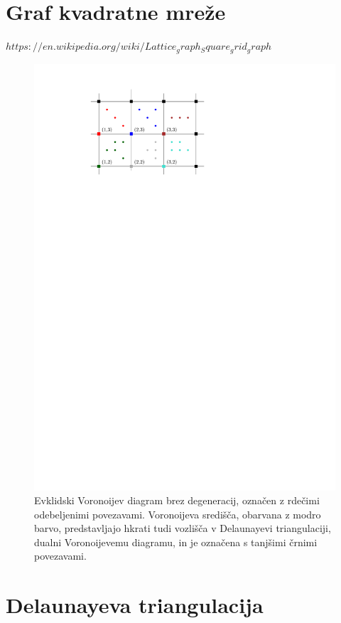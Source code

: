\documentclass[a4paper, 12pt]{book}
\begin{document}
\section{Graf kvadratne mreže}
$https://en.wikipedia.org/wiki/Lattice_graph_Square_grid_graph$
\begin{figure}
\centerline{\includegraphics[scale=1.2]{pics/grid.pdf}}
\caption{Evklidski Voronoijev diagram brez degeneracij, označen z rdečimi odebeljenimi povezavami. Voronoijeva središča, obarvana z modro barvo, predstavljajo hkrati tudi vozlišča v Delaunayevi triangulaciji, dualni Voronoijevemu diagramu, in je označena s tanjšimi črnimi povezavami.}
\label{grid}
\end{figure}


\section{Delaunayeva triangulacija}
\end{document}
